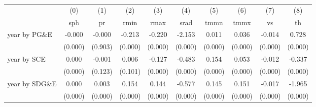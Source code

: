 \begin{tabular}{lccccccccc} \toprule 
 \midrule 
& (0)& (1)& (2)& (3)& (4)& (5)& (6)& (7)& (8)\\ 
& sph& pr& rmin& rmax& srad& tmmn& tmmx& vs& th\\ 
\midrule 
 year by PG\&E & -0.000  & -0.000  & -0.213  & -0.220  & -2.153  & 0.011  & 0.036  & -0.014  & 0.728 \\ 
 & (0.000)  & (0.903)  & (0.000)  & (0.000)  & (0.000)  & (0.000)  & (0.000)  & (0.000)  & (0.000) \\ 
year by SCE & 0.000  & -0.001  & 0.006  & -0.127  & -0.483  & 0.154  & 0.053  & -0.012  & -0.337 \\ 
 & (0.000)  & (0.123)  & (0.101)  & (0.000)  & (0.000)  & (0.000)  & (0.000)  & (0.000)  & (0.000) \\ 
year by SDG\&E & 0.000  & 0.003  & 0.154  & 0.144  & -0.577  & 0.145  & 0.151  & -0.017  & -1.965 \\ 
 & (0.000)  & (0.000)  & (0.000)  & (0.000)  & (0.000)  & (0.000)  & (0.000)  & (0.000)  & (0.000) \\ 
\bottomrule 
\end{tabular}
